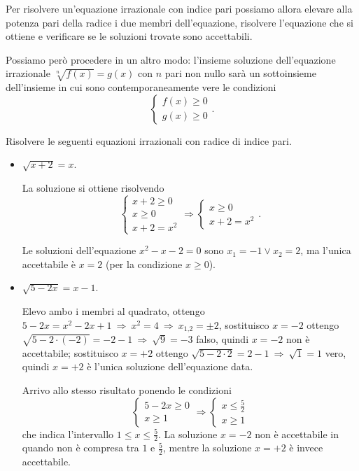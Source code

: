\conclusione Per risolvere un'equazione irrazionale con indice pari possiamo allora elevare alla potenza pari della radice i due membri dell'equazione, risolvere l'equazione che si ottiene e verificare se le soluzioni trovate sono accettabili.

Possiamo però procedere in un altro modo: l'insieme soluzione dell'equazione irrazionale $\sqrt[n]{f(x)}=g(x)$ con $n$ pari non nullo sarà un sottoinsieme dell'insieme in cui sono contemporaneamente vere le condizioni 
\[\left\{\begin{array}{l}{f(x)\ge 0}\\{g(x)\ge 0}\end{array}\right..\]

\begin{exrig}
\begin{esempio}
Risolvere le seguenti equazioni irrazionali con radice di indice pari.
\begin{itemize}
\item $\sqrt{x+2}=x$.

La soluzione si ottiene risolvendo 
\[\left\{\begin{array}{l}x+2\ge 0 \\x\ge 0\\x+2=x^2 \end{array}\right.\Rightarrow \left\{\begin{array}{l}x\ge 0\\x+2=x^2 \end{array}\right..\]

Le soluzioni dell'equazione $x^2-x-2=0$ sono $x_1=-1\vee x_2=2$, ma l'unica accettabile è $x=2$ (per la condizione $x\ge 0$).

\item $\sqrt{5-2x}=x-1$.

Elevo ambo i membri al quadrato, ottengo $5-2x=x^2-2x+1 \:\Rightarrow\: x^2=4 \:\Rightarrow\: x_{1\text{,}2}=\pm 2$,
sostituisco $x=-2$ ottengo $\sqrt{5-2\cdot (-2)}=-2-1 \:\Rightarrow\: \sqrt 9=-3$ falso, quindi $x=-2$ non è accettabile;
sostituisco $x=+2$ ottengo $\sqrt{5-2\cdot 2}=2-1 \:\Rightarrow\: \sqrt 1=1$ vero, quindi $x=+2$ è l'unica soluzione dell'equazione data.

Arrivo allo stesso risultato ponendo le condizioni 
\[\left\{\begin{array}{l}5-2x\ge 0 \\x\ge 1\end{array}\right.\Rightarrow \left\{\begin{array}{l}x\le \frac 5 2\\x\ge 1\end{array}\right.\]
che indica l'intervallo $1\le x\le \frac 5 2$. La soluzione $x=-2$ non è accettabile in quando non è compresa tra $1$ e $\frac 5 2$, mentre la soluzione $x=+2$ è invece accettabile.


\end{itemize}
\end{esempio}
\end{exrig}
